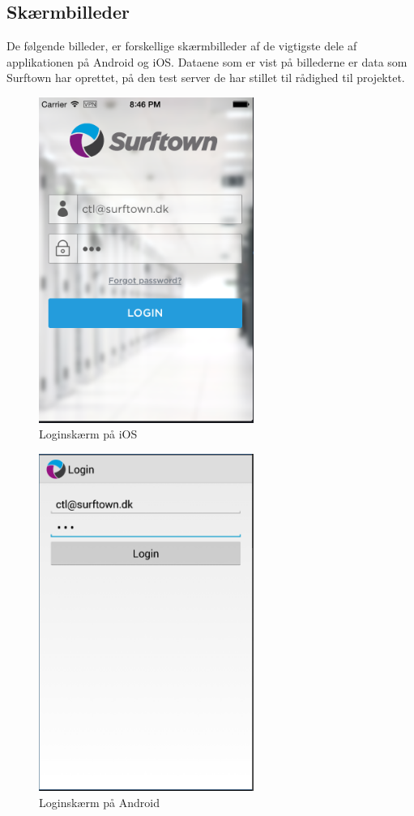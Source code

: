 \documentclass[12pt]{article}
\begin{document}
\subsection*{Skærmbilleder}
De følgende billeder, er forskellige skærmbilleder af de vigtigste dele af applikationen på Android og iOS. Dataene som er vist på billederne er data som Surftown har oprettet, på den test server de har stillet til rådighed til projektet.
\newpage
\begin{figure}[h]
	\centering
	\includegraphics[width=7cm]{ios/login.png}
	\caption{Loginskærm på iOS}
\end{figure}
\newpage
\begin{figure}[h]
	\centering
	\includegraphics[width=7cm]{screenshots/login.png}
	\caption{Loginskærm på Android}
\end{figure}
\end{document}
